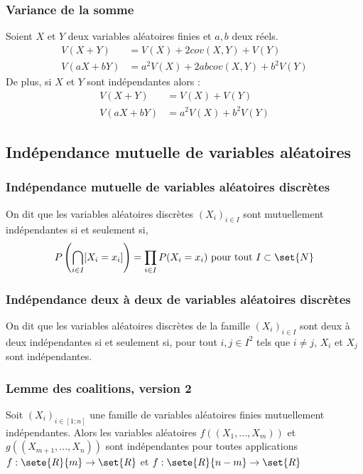         \subsubsection{Variance de la somme}
            Soient $X$ et $Y$ deux variables aléatoires finies et $a, b$ deux réels.
            \begin{align*}
                V(X + Y) &= V(X) + 2cov(X, Y) + V(Y)\\
                V(aX + bY) &= a^2V(X) + 2abcov(X, Y) + b^2V(Y)
            \end{align*}
            De plus, si $X$ et $Y$ sont indépendantes alors :
            \begin{align*}
                V(X + Y) &= V(X) + V(Y)\\
                V(aX + bY) &= a^2V(X) + b^2V(Y)
            \end{align*}

    \subsection{Indépendance mutuelle de variables aléatoires}

        \subsubsection{Indépendance mutuelle de variables aléatoires discrètes}
            On dit que les variables aléatoires discrètes $(X_i)_{i \in I}$ sont mutuellement indépendantes
            si et seulement si,
            \[
                P\left( \bigcap_{i \in I} [X_i = x_i] \right) = \prod_{i \in I} P(X_i = x_i) \text{ pour tout } I \subset \set{N}
            \]

        \subsubsection{Indépendance deux à deux de variables aléatoires discrètes}
            On dit que les variables aléatoires discrètes de la famille $(X_i)_{i \in I}$ sont deux à deux indépendantes
            si et seulement si, pour tout $i, j \in I^2$ tels que $i \neq j$, $X_i$ et $X_j$ sont indépendantes.

        \subsubsection{Lemme des coalitions, version 2}
            Soit $(X_i)_{i \in [1; n]}$ une famille de variables aléatoires finies mutuellement indépendantes.
            Alors les variables aléatoires $f((X_1, ..., X_m))$ et $g((X_{m+1}, ..., X_n))$ sont indépendantes 
            pour toutes applications $f : \sete{R}{m} \rightarrow \set{R}$ et $f : \sete{R}{{n-m}} \rightarrow \set{R}$
        
